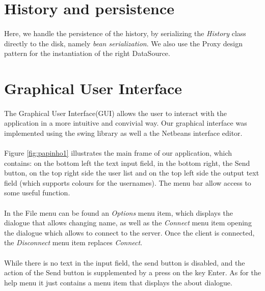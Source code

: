 \documentclass[times, 8pt,twocolumn]{article}
\begin{document}
\section{History and persistence}
\paragraph{} Here, we handle the persistence of the history, by serializing the {\it History} class directly to the disk, namely {\it bean serialization}. We also use the Proxy design pattern for the instantiation of the right DataSource. 
\section{Graphical User Interface}
\paragraph{} The Graphical User Interface(GUI) allows the user to interact with the application in a more intuitive and convivial way. Our graphical interface was implemented using the swing library as well a the Netbeans interface editor.
\paragraph{} Figure \ref{fig:papinho1} illustrates the main frame of our application, which contains: on the bottom left the text input field, in the bottom right, the Send button, on the top right side the user list and on the top left side the output text field (which supports colours for the usernames). The menu bar allow access to some useful function. 
\paragraph{} In the File menu can be found an {\it Options} menu item, which displays the dialogue that allows changing name, as well as the {\it Connect} menu item opening the dialogue which allows to connect to the server. Once the client is connected, the {\it Disconnect} menu item replaces {\it Connect}. 
\paragraph{} While there is no text in the input field, the send button is disabled, and the action of the Send button is supplemented by a press on the key Enter. As for the help menu it just contains a menu item that displays the about dialogue. 
\end{document}
